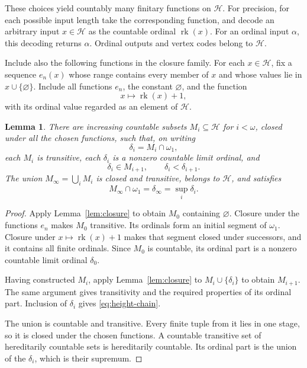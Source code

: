 \documentclass[11pt,leqno]{amsart}
\newtheorem{lemma}[theorem]{Lemma}
\theoremstyle{definition}
\numberwithin{equation}{section}
\newcommand{\HH}{\mathcal H}
\newcommand{\rk}{\operatorname{rk}}
\newcommand{\sub}{\subseteq}
\begin{document}
These choices yield countably many finitary functions on $\HH$. For precision, for each possible input length take the corresponding function, and decode an arbitrary input $x\in\HH$ as the countable ordinal $\rk(x)$. For an ordinal input $\alpha$, this decoding returns $\alpha$. Ordinal outputs and vertex codes belong to $\HH$.

Include also the following functions in the closure family. For each $x\in\HH$, fix a sequence $e_n(x)$ whose range contains every member of $x$ and whose values lie in $x\cup\{\varnothing\}$. Include all functions $e_n$, the constant $\varnothing$, and the function
\[
x\longmapsto\rk(x)+1,
\]
with its ordinal value regarded as an element of $\HH$.

\begin{lemma}\label{lem:models}
There are increasing countable subsets $M_i\sub\HH$ for $i<\omega$, closed under all the chosen functions, such that, on writing
\[
\delta_i=M_i\cap\omega_1,
\]
each $M_i$ is transitive, each $\delta_i$ is a nonzero countable limit ordinal, and
\begin{equation}\label{eq:height-chain}
\delta_i\in M_{i+1},\qquad \delta_i<\delta_{i+1}.
\end{equation}
The union $M_\infty=\bigcup_iM_i$ is closed and transitive, belongs to $\HH$, and satisfies
\[
M_\infty\cap\omega_1=\delta_\infty=\sup_i\delta_i.
\]
\end{lemma}

\begin{proof}
Apply Lemma~\ref{lem:closure} to obtain $M_0$ containing $\varnothing$. Closure under the functions $e_n$ makes $M_0$ transitive. Its ordinals form an initial segment of $\omega_1$. Closure under $x\mapsto\rk(x)+1$ makes that segment closed under successors, and it contains all finite ordinals. Since $M_0$ is countable, its ordinal part is a nonzero countable limit ordinal $\delta_0$.

Having constructed $M_i$, apply Lemma~\ref{lem:closure} to $M_i\cup\{\delta_i\}$ to obtain $M_{i+1}$. The same argument gives transitivity and the required properties of its ordinal part. Inclusion of $\delta_i$ gives \eqref{eq:height-chain}.

The union is countable and transitive. Every finite tuple from it lies in one stage, so it is closed under the chosen functions. A countable transitive set of hereditarily countable sets is hereditarily countable. Its ordinal part is the union of the $\delta_i$, which is their supremum.
\end{proof}
\end{document}
